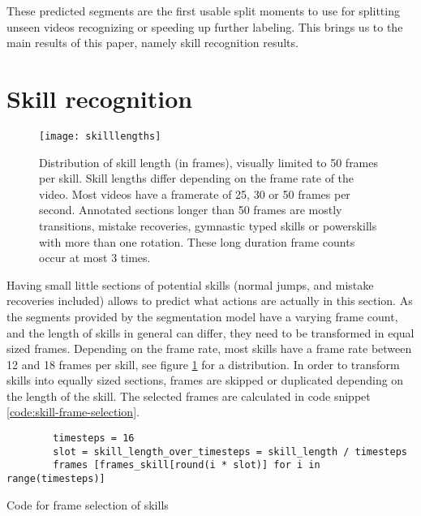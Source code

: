 These predicted segments are the first usable split moments to use for splitting unseen videos recognizing or speeding up further labeling.
This brings us to the main results of this paper, namely skill recognition results.


\section{Skill recognition}
\label{results:skill-recognition}

\begin{figure}
    \centering
    \texttt{[image: skilllengths]}
    \caption[frame counts of skill lengths]{Distribution of skill length (in frames), visually limited to 50 frames per skill. Skill lengths differ depending on the frame rate of the video. Most videos have a framerate of 25, 30 or 50 frames per second. Annotated sections longer than 50 frames are mostly transitions, mistake recoveries, gymnastic typed skills or powerskills with more than one rotation. These long duration frame counts occur at most 3 times.}
    \label{fig:skilllengths-counts}
\end{figure}


Having small little sections of potential skills (normal jumps, and mistake recoveries included) allows to predict what actions are actually in this section.
As the segments provided by the segmentation model have a varying frame count, and the length of skills in general can differ, they need to be transformed in equal sized frames.
Depending on the frame rate, most skills have a frame rate between 12 and 18 frames per skill, see figure \ref{fig:skilllengths-counts} for a distribution. In order to transform skills into equally sized sections, frames are skipped or duplicated depending on the length of the skill.
The selected frames are calculated in code snippet \ref{code:skill-frame-selection}.


\begin{listing}
    \begin{verbatim}
        timesteps = 16
        slot = skill_length_over_timesteps = skill_length / timesteps
        frames [frames_skill[round(i * slot)] for i in range(timesteps)]
    \end{verbatim}
    \caption[Code for frame selection skills]{Code for frame selection of skills}
    \label{code:skill-frame-selection}
\end{listing}



